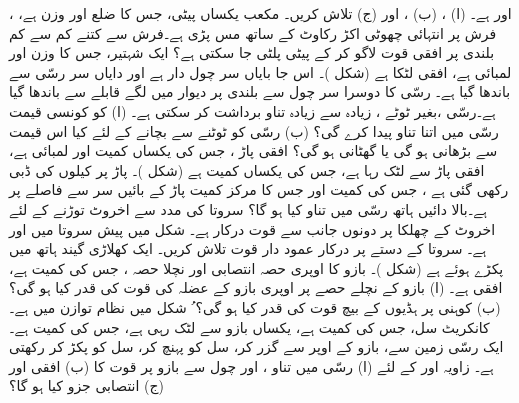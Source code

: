 ، اور  ہے۔ (ا)  ، (ب)  ، اور (ج)  تلاش کریں۔
مکعب یکساں پیٹی، جس کا ضلع   اور وزن  ہے،   فرش پر   انتہائی چھوٹی   اکڑ رکاوٹ کے ساتھ مس  پڑی ہے۔فرش سے کتنے کم سے کم بلندی پر   افقی قوت لاگو کر کے پیٹی پلٹی جا سکتی ہے؟
ایک شہتیر، جس کا وزن  اور لمبائی  ہے، افقی لٹکا ہے  (شکل )۔  اس جا بایاں سر چول دار ہے اور دایاں سر رسّی سے باندھا گیا ہے۔ رسّی کا دوسرا سر چول سے  بلندی پر دیوار میں لگے قابلے  سے  باندھا گیا ہے۔رسّی ،بغیر ٹوٹے   ، زیادہ سے زیادہ  تناو  برداشت کر سکتی  ہے۔ (ا)   کو کونسی قیمت رسّی میں اتنا تناو پیدا کرے گی؟ (ب)  رسّی کو  ٹوٹنے سے   بچانے کے لئے  کیا     اس قیمت سے بڑھانی ہو گی یا گھٹانی ہو گی؟
افقی پاڑ  ، جس کی یکساں کمیت  اور لمبائی   ہے، افقی پاڑ  سے لٹک رہا ہے، جس کی  یکساں کمیت   ہے (شکل )۔ پاڑ  پر  کیلوں کی ڈبی رکھی گئی ہے ،   جس کی کمیت  اور جس کا مرکز کمیت پاڑ کے بائیں سر سے  فاصلے پر ہے۔بالا دائیں  ہاتھ   رسّی میں تناو  کیا ہو گا؟
سروتا کی مدد سے  اخروٹ  توڑنے کے لئے  اخروٹ کے چھلکا پر دونوں جانب سے  قوت درکار ہے۔ شکل   میں پیش سروتا  میں   اور  ہے۔ سروتا کے دستے پر  درکار عمود دار قوت  تلاش کریں۔
ایک کھلاڑی  گیند ہاتھ میں پکڑے  ہوئے ہے (شکل )۔ بازو کا اوپری حصہ انتصابی اور نچلا حصہ  ، جس کی
 کمیت  ہے، افقی ہے۔ (ا)  بازو کے نچلے حصے پر اوپری  بازو کے عضلہ  کی قوت  کی قدر کیا ہو گی؟ (ب)  کوہنی  پر ہڈیوں کے بیچ قوت کی قدر کیا ہو گی؟
ُ
شکل  میں  نظام توازن میں ہے۔کانکریٹ سل، جس کی کمیت  ہے، یکساں  بازو  سے لٹک رہی ہے، جس کی کمیت  ہے۔ ایک رسّی  زمین سے، بازو کے اوپر سے گزر کر، سل کو پہنچ کر، سل کو پکڑ کر رکھتی ہے۔ زاویہ   
اور  کے لئے  (ا)  رسّی میں تناو  ، اور  چول سے بازو پر قوت کا  (ب) افقی اور (ج) انتصابی جزو کیا ہو گا؟
